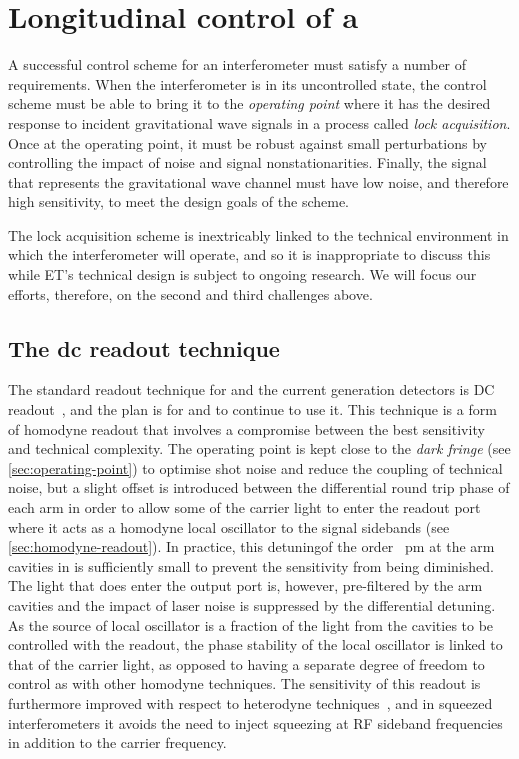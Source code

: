 \section[Longitudinal control of a \DRFPMI{}]{\label{sec:multi-dof-control}Longitudinal control of a \DRFPMI{}%
}
A successful control scheme for an interferometer must satisfy a number of requirements. When the interferometer is in its uncontrolled state, the control scheme must be able to bring it to the \emph{operating point} where it has the desired response to incident gravitational wave signals in a process called \emph{lock acquisition}. Once at the operating point, it must be robust against small perturbations by controlling the impact of noise and signal nonstationarities. Finally, the signal that represents the gravitational wave channel must have low noise, and therefore high sensitivity, to meet the design goals of the scheme.

The lock acquisition scheme is inextricably linked to the technical environment in which the interferometer will operate, and so it is inappropriate to discuss this while \gls{ET}'s technical design is subject to ongoing research. We will focus our efforts, therefore, on the second and third challenges above.

\subsection{The dc readout technique}
The standard readout technique for \GEO{} and the current generation detectors is \gls{DC} readout~\cite{Hild2007, Ward2008, Fricke2012}, and the plan is for \ETLF{} and \ETHF{} to continue to use it. This technique is a form of homodyne readout that involves a compromise between the best sensitivity and technical complexity. The operating point is kept close to the \emph{dark fringe} (see \cref{sec:operating-point}) to optimise shot noise and reduce the coupling of technical noise, but a slight offset is introduced between the differential round trip phase of each arm in order to allow some of the carrier light to enter the readout port where it acts as a homodyne local oscillator to the signal sidebands (see \cref{sec:homodyne-readout}). In practice, this detuning\textemdash of the order \SI{}{\pico\meter} at the arm cavities in \ALIGO{}\textemdash is sufficiently small to prevent the sensitivity from being diminished. The light that does enter the output port is, however, pre-filtered by the arm cavities and the impact of laser noise is suppressed by the differential detuning. As the source of local oscillator is a fraction of the light from the cavities to be controlled with the readout, the phase stability of the local oscillator is linked to that of the carrier light, as opposed to having a separate degree of freedom to control as with other homodyne techniques. The sensitivity of this readout is furthermore improved with respect to heterodyne techniques~\cite{Fricke2012}, and in squeezed interferometers it avoids the need to inject squeezing at \gls{RF} sideband frequencies in addition to the carrier frequency.

